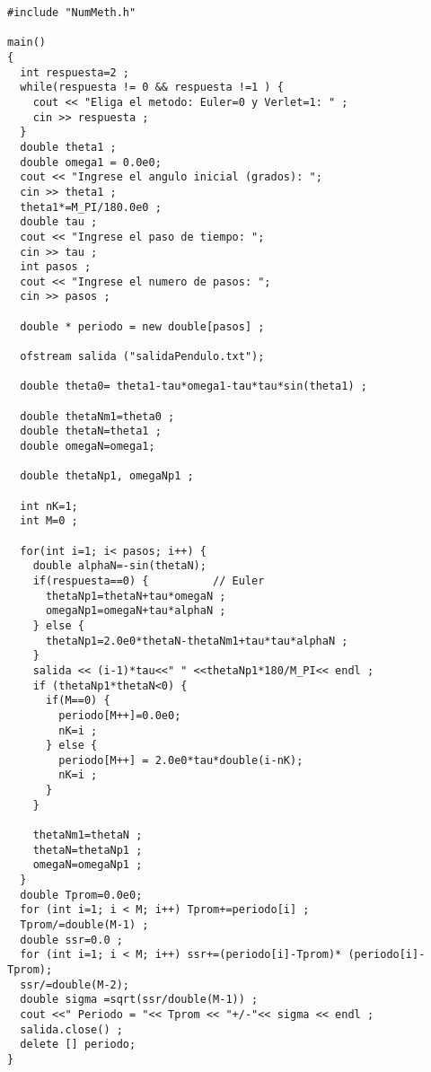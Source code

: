 \begin{verbatim}
#include "NumMeth.h"

main()
{
  int respuesta=2 ;
  while(respuesta != 0 && respuesta !=1 ) {
    cout << "Eliga el metodo: Euler=0 y Verlet=1: " ;
    cin >> respuesta ;
  }
  double theta1 ;
  double omega1 = 0.0e0;
  cout << "Ingrese el angulo inicial (grados): ";
  cin >> theta1 ;
  theta1*=M_PI/180.0e0 ;
  double tau ;
  cout << "Ingrese el paso de tiempo: ";
  cin >> tau ;
  int pasos ;
  cout << "Ingrese el numero de pasos: ";
  cin >> pasos ;
  
  double * periodo = new double[pasos] ;

  ofstream salida ("salidaPendulo.txt");

  double theta0= theta1-tau*omega1-tau*tau*sin(theta1) ;
  
  double thetaNm1=theta0 ;
  double thetaN=theta1 ;
  double omegaN=omega1;

  double thetaNp1, omegaNp1 ;

  int nK=1;
  int M=0 ;

  for(int i=1; i< pasos; i++) {
    double alphaN=-sin(thetaN);
    if(respuesta==0) {          // Euler
      thetaNp1=thetaN+tau*omegaN ;
      omegaNp1=omegaN+tau*alphaN ;
    } else {
      thetaNp1=2.0e0*thetaN-thetaNm1+tau*tau*alphaN ;
    }
    salida << (i-1)*tau<<" " <<thetaNp1*180/M_PI<< endl ;
    if (thetaNp1*thetaN<0) {
      if(M==0) {
        periodo[M++]=0.0e0;
        nK=i ;
      } else {
        periodo[M++] = 2.0e0*tau*double(i-nK);
        nK=i ;
      }
    }

    thetaNm1=thetaN ;
    thetaN=thetaNp1 ;
    omegaN=omegaNp1 ;
  }
  double Tprom=0.0e0;
  for (int i=1; i < M; i++) Tprom+=periodo[i] ;
  Tprom/=double(M-1) ;
  double ssr=0.0 ;
  for (int i=1; i < M; i++) ssr+=(periodo[i]-Tprom)* (periodo[i]-Tprom);
  ssr/=double(M-2);
  double sigma =sqrt(ssr/double(M-1)) ;
  cout <<" Periodo = "<< Tprom << "+/-"<< sigma << endl ; 
  salida.close() ;
  delete [] periodo;
}
\end{verbatim}


